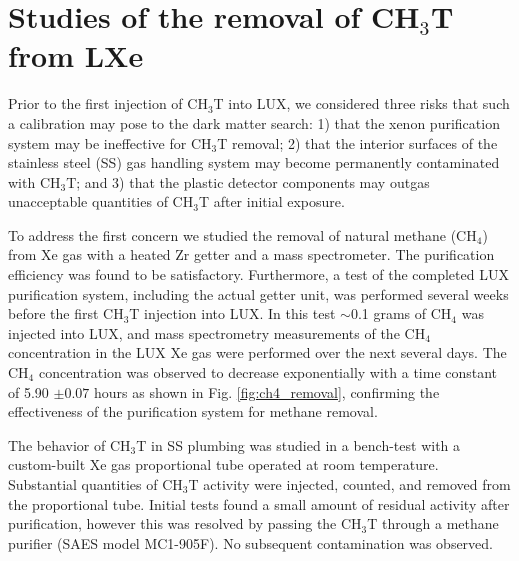 \section{Studies of the removal of CH$_3$T from LXe }
\label{sec:appendix1}

\newcommand*{\Scale}[2][4]{\scalebox{#1}{$#2$}}%

Prior to the first injection of CH$_3$T into LUX, we considered three risks that such a calibration may pose to the dark matter search: 1) that the xenon purification system may be ineffective for CH$_3$T removal; 2) that the interior surfaces of the stainless steel (SS)  gas handling system may become permanently contaminated with CH$_3$T; and 3) that the plastic detector components may outgas unacceptable quantities of CH$_3$T after initial exposure.

To address the first concern we studied the removal of natural methane (CH$_4$) from Xe gas with a heated Zr getter and a mass spectrometer. The purification efficiency was found to be satisfactory\cite{Dobi_CH4}. Furthermore, a test of the completed LUX purification system, including the actual getter unit, was performed several weeks before the first CH$_3$T injection into LUX. In this test $\sim$0.1 grams of CH$_4$ was injected into LUX, and mass spectrometry measurements of the CH$_4$ concentration in the LUX Xe gas were performed over the next several days. The CH$_4$ concentration was observed to decrease exponentially with a time constant of 5.90 $\pm 0.07$ hours as shown in Fig. \ref{fig:ch4_removal}, confirming the effectiveness of the purification system for methane removal.

The behavior of CH$_3$T in SS plumbing was studied in a bench-test with a custom-built Xe gas proportional tube operated at room temperature. Substantial quantities of CH$_3$T activity were injected, counted, and removed from the proportional tube. Initial tests found a small amount of residual activity after purification, however this was resolved by passing the CH$_3$T through a methane purifier (SAES model MC1-905F). No subsequent contamination was observed.


